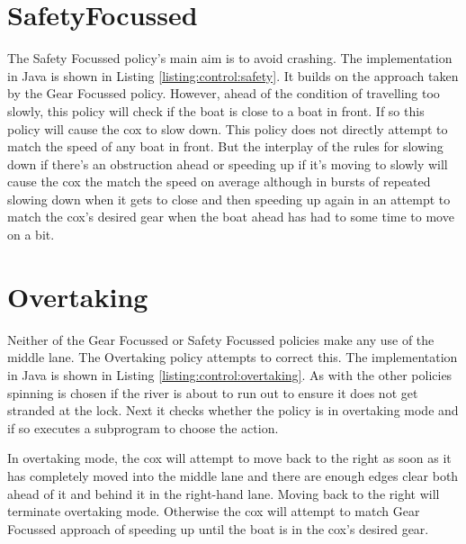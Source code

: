 

\section{SafetyFocussed}

The Safety Focussed policy's main aim is to avoid crashing. The implementation in Java is shown in Listing \ref{listing:control:safety}. It builds on the approach taken by the Gear Focussed policy. However, ahead of the condition of travelling too slowly, this policy will check if the boat is close to a boat in front. If so this policy will cause the cox to slow down. This policy does not directly attempt to match the speed of any boat in front. But the interplay of the rules for slowing down if there's an obstruction ahead or speeding up if it's moving to slowly will cause the cox the match the speed on average although in bursts of repeated slowing down when it gets to close and then speeding up again in an attempt to match the cox's desired gear when the boat ahead has had to some time to move on a bit.



\section{Overtaking}

Neither of the Gear Focussed or Safety Focussed policies make any use of the middle lane. The Overtaking policy  attempts to correct this. The implementation in Java is shown in Listing \ref{listing:control:overtaking}. As with the other policies spinning is chosen if the river is about to run out to ensure it does not get stranded at the lock. Next it checks whether the policy is in overtaking mode and if so executes a subprogram to choose the action.

In overtaking mode, the cox will attempt to move back to the right as soon as it has completely moved into the middle lane and there are enough edges clear both ahead of it and behind it in the right-hand lane. Moving back to the right will terminate overtaking mode. Otherwise the cox will attempt to match Gear Focussed approach of speeding up until the boat is in the cox's desired gear.

